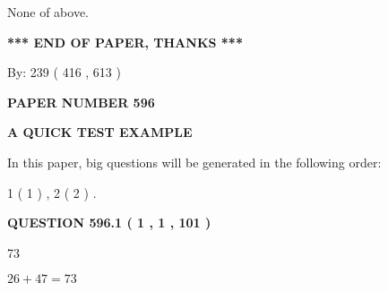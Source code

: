 \documentclass[12pt]{article}
\begin{document}
  
 
 
\noindent{}
 
 
 None of above.
 
 
 
 
   
   
 \vspace{0.2in}
 
   
   
   
   
\vspace{1.0in} 
{\textbf{\large{ *** END OF PAPER, THANKS *** }}} 
   
   
\hspace{1.0in} By: 
 239 ( 416 ,  613 )
   
   
   
   
\newpage 
\setcounter{page}{ 
   596001 } 
   
   
   
   
 {\textbf{ \Large{ PAPER NUMBER  596  }}}
   
   
\vspace{0.2in}
   
   
   
   
   
   
 \vspace{0.2in}
{\LARGE {\textbf{ A QUICK TEST EXAMPLE}}}
   
   
   
\vspace{0.2in}
   
In this paper, big questions will be generated in the following order: 
   
   
   1 ( 1 )
 ,
   2 ( 2 )
 .
  
\vspace{0.2in}
  
{\textbf{\Large{QUESTION
596.1 
 ( 1 , 1 , 101 )
}}}
  
  
 
 
\noindent{}

73
 
 
 
 
\noindent{}

$ %
26 +  %
47=   %
73$
 
\end{document}
